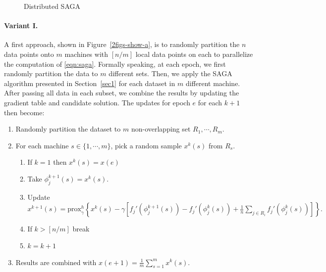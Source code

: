 \documentclass[a4paper,10pt]{article}
\newcommand{\prox}{\textrm{prox}}
\begin{document}
\begin{figure}[ht]
	\centering
	\hspace{0pt}
	\caption{Distributed SAGA}
	\label{2figs-show}
\end{figure}

\paragraph{Variant I.} A first approach, shown in Figure~\ref{2figs-show-a}, is
to randomly partition the $n$ data points onto $m$ machines with $[n/m]$ local
data points on each to parallelize the computation of \eqref{eqn:saga}. Formally
speaking, at each epoch, we first randomly partition the data to $m$ different
sets. Then, we apply the SAGA algorithm presented in Section~\ref{sec1} for each
dataset in $m$ different machine. After passing all data in each subset, we
combine the results by updating the gradient table and candidate solution. The
updates for epoch $e$ for each $k+1$ then become:
\begin{enumerate}
	\item Randomly partition the dataset to $m$ non-overlapping set $R_1, \cdots, R_m$.
	\item For each machine $s \in \{ 1, \cdots, m \}$, pick a random sample $x^k(s)$ from $R_s$.
	\begin{enumerate}
		\item If $ k = 1 $ then $x^k(s) = x(e)$
		\item Take $\phi_j^{k+1}(s) = x^k(s)$.
		\item Update $x^{k+1}(s) = \prox_\gamma^h \left\{ 
			x^k(s) - \gamma \left[ f_j'(\phi_j^{k+1}(s)) - f_j'(\phi_j^k(s))
		+ \frac1n \sum_{j \in R_i} f_j'(\phi_j^k(s)) \right] \right\}.$
		\item If $ k > [n/m]$ break
		\item $k = k+1$
	\end{enumerate}	
	\item Results are combined with $ x(e+1) = \frac{1}{m} \sum_{s=1}^m x^k(s)$.
\end{enumerate}
\end{document}
